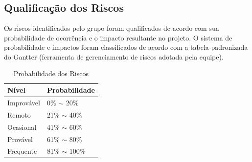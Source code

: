 \begin{apendicesenv}
	\subsection{Qualificação dos Riscos}
	Os riscos identificados pelo grupo foram qualificados de acordo com sua probabilidade de ocorrência e o impacto resultante no projeto. O sistema de probabilidade e impactos foram classificados de acordo com a tabela padronizada do Gantter (ferramenta de gerenciamento de riscos adotada pela equipe).
	
	\begin{table}[h!]
\centering
\caption{Probabilidade dos Riscos}
\label{tabela_probabilidade_riscos}
\begin{tabular}{|ll|}
\hline
\multicolumn{1}{|l|}{\textbf{Nível}} & \textbf{Probabilidade} \\ \hline
Improvável                           & 0\% $\sim$ 20\%        \\
Remoto                               & 21\% $\sim$ 40\%       \\
Ocasional                            & 41\% $\sim$ 60\%       \\
Provável                             & 61\% $\sim$ 80\%       \\
Frequente                            & 81\% $\sim$ 100\%      \\ \hline
\end{tabular}
\end{table}	


\end{apendicesenv}
